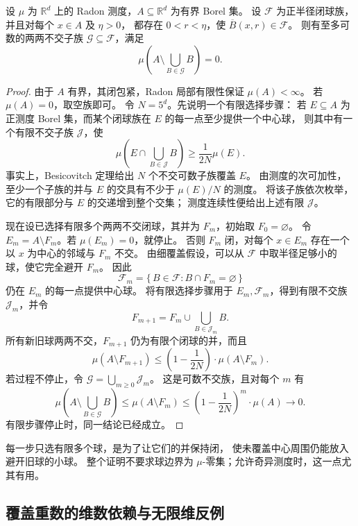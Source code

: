 \begin{corollary}\label{b1:cor:radon-vitali-covering}
设 \(\mu\) 为 \(\mathbb R^d\) 上的 Radon 测度，\(A\subseteq\mathbb R^d\) 为有界 Borel 集。
设 \(\mathcal F\) 为正半径闭球族，并且对每个 \(x\in A\) 及 \(\eta>0\)，
都存在 \(0<r<\eta\)，使 \(\overline B(x,r)\in\mathcal F\)。
则有至多可数的两两不交子族 \(\mathcal G\subseteq\mathcal F\)，满足
\[
 \mu\left(A\setminus\bigcup_{B\in\mathcal G}B\right)=0.
\]
\end{corollary}
\begin{proof}
由于 \(A\) 有界，其闭包紧，Radon 局部有限性保证 \(\mu(A)<\infty\)。
若 \(\mu(A)=0\)，取空族即可。
令 \(N=5^d\)。先说明一个有限选择步骤：
若 \(E\subseteq A\) 为正测度 Borel 集，而某个闭球族在 \(E\) 的每一点至少提供一个中心球，
则其中有一个有限不交子族 \(\mathcal J\)，使
\[
 \mu\left(E\cap\bigcup_{B\in\mathcal J}B\right)
 \geq\frac1{2N}\mu(E).
\]
事实上，Besicovitch 定理给出 \(N\) 个不交可数子族覆盖 \(E\)。
由测度的次可加性，至少一个子族的并与 \(E\) 的交具有不少于 \(\mu(E)/N\) 的测度。
将该子族依次枚举，它的有限部分与 \(E\) 的交递增到整个交集；
测度连续性便给出上述有限 \(\mathcal J\)。

现在设已选择有限多个两两不交闭球，其并为 \(F_m\)，初始取 \(F_0=\varnothing\)。
令 \(E_m=A\setminus F_m\)。若 \(\mu(E_m)=0\)，就停止。
否则 \(F_m\) 闭，对每个 \(x\in E_m\) 存在一个以 \(x\) 为中心的邻域与 \(F_m\) 不交。
由细覆盖假设，可以从 \(\mathcal F\) 中取半径足够小的球，使它完全避开 \(F_m\)。
因此
\[
 \mathcal F_m=\{\,B\in\mathcal F:B\cap F_m=\varnothing\,\}
\]
仍在 \(E_m\) 的每一点提供中心球。
将有限选择步骤用于 \(E_m,\mathcal F_m\)，得到有限不交族 \(\mathcal J_m\)，并令
\[
 F_{m+1}=F_m\cup\bigcup_{B\in\mathcal J_m}B.
\]
所有新旧球两两不交，\(F_{m+1}\) 仍为有限个闭球的并，而且
\[
 \mu(A\setminus F_{m+1})
 \leq\left(1-\frac1{2N}\right)\cdot\mu(A\setminus F_m).
\]
若过程不停止，令 \(\mathcal G=\bigcup_{m\geq0}\mathcal J_m\)。
这是可数不交族，且对每个 \(m\) 有
\[
 \mu\left(A\setminus\bigcup_{B\in\mathcal G}B\right)
 \leq\mu(A\setminus F_m)
 \leq\left(1-\frac1{2N}\right)^m\cdot\mu(A)\longrightarrow0.
\]
有限步骤停止时，同一结论已经成立。
\end{proof}

每一步只选有限多个球，是为了让它们的并保持闭，
使未覆盖中心周围仍能放入避开旧球的小球。
整个证明不要求球边界为 \(\mu\)-零集；允许奇异测度时，这一点尤其有用。

\subsection{覆盖重数的维数依赖与无限维反例}
\label{b1:subsec:130204}

